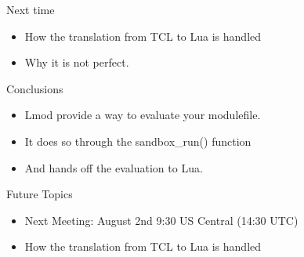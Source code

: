 \documentclass{beamer}
\begin{document}

\begin{frame}{Next time}
  \begin{itemize}
    \item How the translation from TCL to Lua is handled
    \item Why it is not perfect.
  \end{itemize}
\end{frame}



\begin{frame}{Conclusions}
  \begin{itemize}
    \item Lmod provide a way to evaluate your modulefile.
    \item It does so through the sandbox_run() function
    \item And hands off the evaluation to Lua.
  \end{itemize}
\end{frame}

\begin{frame}{Future Topics}
  \begin{itemize}
    \item Next Meeting: August 2nd 9:30 US Central (14:30 UTC)
    \item How the translation from TCL to Lua is handled
  \end{itemize}
\end{frame}
\end{document}
